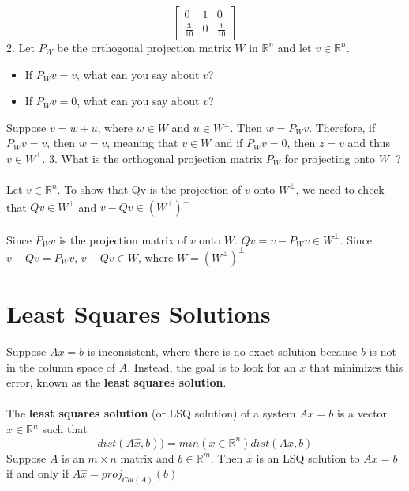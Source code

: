 \begin{enumerate}
\[\begin{bmatrix}
  0 & 1 & 0 \\ \frac{3}{10} & 0 & \frac{1}{10} \end{bmatrix}
\]
2. Let $P_W$ be the orthogonal projection matrix $W$ in $\mathbb{R}^n$ 
and let $v \in \mathbb{R}^n$. 
\begin{itemize}
  \item If $P_Wv = v$, what can you say about $v$? 
  \item If $P_Wv = 0$, what can you say about $v$?
\end{itemize}
Suppose $v = w + u$, where $w \in W$ and $u \in W^\perp$. Then 
$w = P_Wv$. Therefore, if $P_Wv = v$, then $w = v$, meaning that 
$v \in W$ and if $P_Wv = 0$, then $z = v$ and thus $v \in W^\perp$. 
3. What is the orthogonal projection matrix $P_W^\perp$ for 
projecting onto $W^\perp$? \\\\
Let $v \in \mathbb{R}^n$. To show that Qv is the projection of $v$ 
onto $W^\perp$, we need to check that $Qv \in W^\perp$ and $v - Qv 
\in (W^\perp)^\perp$ \\\\
Since $P_Wv$ is the projection matrix of $v$ onto $W$. $Qv = v - 
P_Wv \in W^\perp$. Since $v - Qv = P_Wv$, $v - Qv \in W$, where
$W = (W^\perp)^\perp$
\section{Least Squares Solutions}
Suppose $Ax = b$ is inconsistent, where there is no exact solution 
because $b$ is not in the column space of $A$. Instead, the goal 
is to look for an $x$ that minimizes this error, known as the 
\textbf{least squares solution}. \\\\ 
The \textbf{least squares solution} (or LSQ solution) of a system 
$Ax = b$ is a vector $\hat{x} \in \mathbb{R}^n$ such that 
\[
  dist(A\hat{x}, b)) = min(x \in \mathbb{R}^n) dist(Ax, b)
\]
Suppose $A$ is an $m \times n$ matrix and $b \in \mathbb{R}^m$. Then 
$\hat{x}$ is an LSQ solution to $Ax = b$ if and only if $A\hat{x} 
= proj_{Col(A)}(b)$

\end{enumerate}
